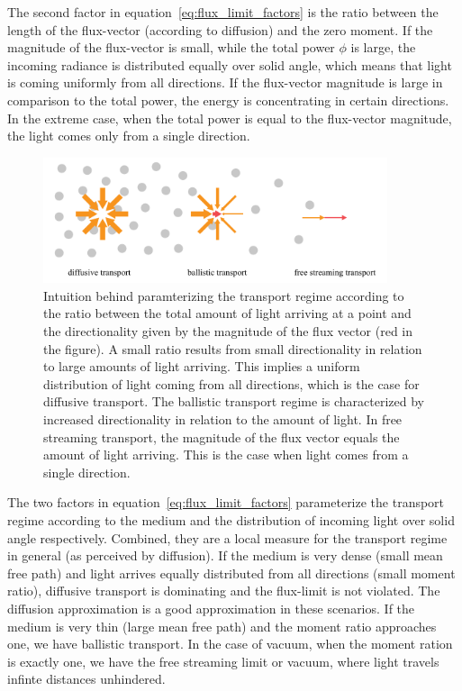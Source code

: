 The second factor in equation~\ref{eq:flux_limit_factors} is the ratio between the length of the flux-vector (according to diffusion) and the zero moment. If the magnitude of the flux-vector is small, while the total power $\phi$ is large, the incoming radiance is distributed equally over solid angle, which means that light is coming uniformly from all directions. If the flux-vector magnitude is large in comparison to the total power, the energy is concentrating in certain directions. In the extreme case, when the total power is equal to the flux-vector magnitude, the light comes only from a single direction.
\begin{figure}[h]
\centering
\includegraphics[width=0.9\textwidth]{06_fld/figures/fig_transport_regimes_moment_ratio.pdf}
\caption{Intuition behind paramterizing the transport regime according to the ratio between the total amount of light arriving at a point and the directionality given by the magnitude of the flux vector (red in the figure). A small ratio results from small directionality in relation to large amounts of light arriving. This implies a uniform distribution of light coming from all directions, which is the case for diffusive transport. The ballistic transport regime is characterized by increased directionality in relation to the amount of light. In free streaming transport, the magnitude of the flux vector equals the amount of light arriving. This is the case when light comes from a single direction.}
\label{fig:fld_transport_regimes_mfp}
\end{figure}

The two factors in equation~\ref{eq:flux_limit_factors} parameterize the transport regime according to the medium and the distribution of incoming light over solid angle respectively. Combined, they are a local measure for the transport regime in general (as perceived by diffusion). If the medium is very dense (small mean free path) and light arrives equally distributed from all directions (small moment ratio), diffusive transport is dominating and the flux-limit is not violated. The diffusion approximation is a good approximation in these scenarios. If the medium is very thin (large mean free path) and the moment ratio approaches one, we have ballistic transport. In the case of vacuum, when the moment ration is exactly one, we have the free streaming limit or vacuum, where light travels infinte distances unhindered.

